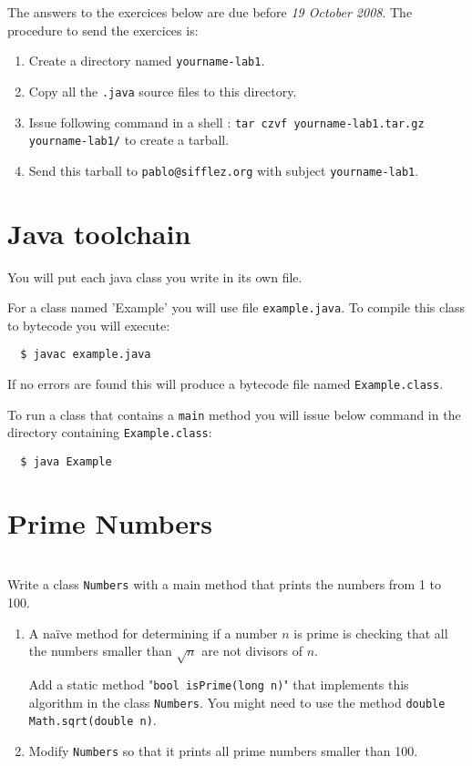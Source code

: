 \documentclass{exercices}
\renewcommand{\|}{\url|}
\begin{document}

The answers to the exercices below are due before \emph{19 October 2008}. 
The procedure to send the exercices is:
\begin{enumerate}
  \item Create a directory named \verb!yourname-lab1!.
  \item Copy all the \verb!.java! source files to this directory.
  \item Issue following command in a shell : \verb!tar czvf yourname-lab1.tar.gz yourname-lab1/!
        to create a tarball.
  \item Send this tarball to \verb!pablo@sifflez.org! with subject \verb!yourname-lab1!.
\end{enumerate}

\section{Java toolchain}
You will put each java class you write in its own file.

For a class named 'Example' you will use file \verb!example.java!.
To compile this class to bytecode you will execute:
\begin{verbatim}
  $ javac example.java
\end{verbatim}
If no errors are found this will produce a bytecode file named \verb!Example.class!.

To run a class that contains a \verb!main! method you will issue below command
in the directory containing \verb!Example.class!:
\begin{verbatim}
  $ java Example
\end{verbatim}

\section{Prime Numbers}
\begin{exercice}\\ 
Write a class \verb!Numbers! with a main method that prints the numbers from 1 to 100.
\end{exercice}
\begin{exercice}
\begin{enumerate}
\item
A naïve method for determining if a number $n$ is prime is checking that all the numbers smaller
than $\sqrt{n}$ are not divisors of $n$.

Add a static method "\verb!bool isPrime(long n)!" that implements this algorithm in the class \verb!Numbers!.
You might need to use the method \verb!double Math.sqrt(double n)!.
\item
 Modify \verb!Numbers! so that it prints all prime numbers smaller than 100.
\end{enumerate}
\end{exercice}
\end{document}
